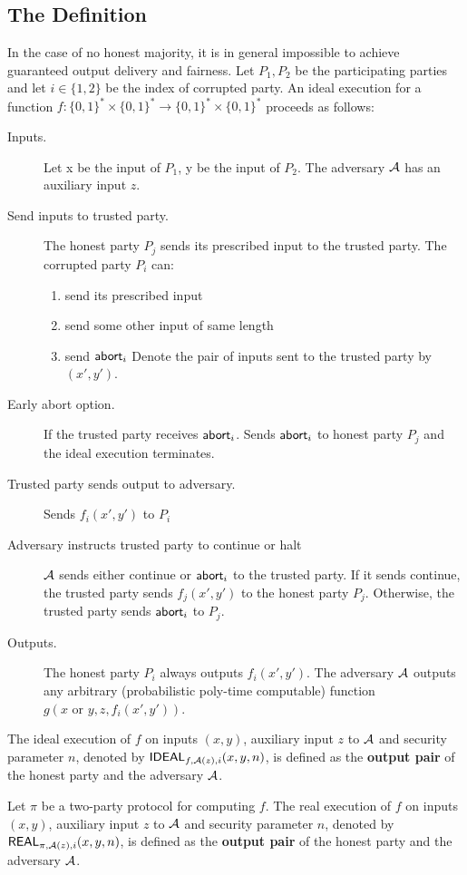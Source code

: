 \subsection{The Definition}

\begin{description}[leftmargin=0em]
\item[Execution in ideal mode.] In the case of no honest majority, it is in general impossible to achieve guaranteed output delivery and fairness. Let $P_1,P_2$ be the participating parties and let $i\in\{1,2\}$ be the index of corrupted party. An ideal execution for a function $f:\{0,1\}^*\times\{0,1\}^*\to\{0,1\}^*\times\{0,1\}^*$ proceeds as follows:
\begin{description}
\item[Inputs.] Let x be the input of $P_1$, y be the input of $P_2$. The adversary $\mathcal{A}$ has an auxiliary input $z$.
\item[Send inputs to trusted party.] The honest party $P_j$ sends its prescribed input to the trusted party. The corrupted party $P_i$ can:
\begin{enumerate}
\item send its prescribed input
\item send some other input of same length
\item send ${\sf abort}_i$
Denote the pair of inputs sent to the trusted party by $(x',y')$.
\end{enumerate}
\item[Early abort option.] If the trusted party receives ${\sf abort}_i$. Sends ${\sf abort}_i$ to honest party $P_j$ and the ideal execution terminates.
\item[Trusted party sends output to adversary.] Sends $f_i(x',y')$ to $P_i$
\item[Adversary instructs trusted party to continue or halt] $\mathcal{A}$ sends either {\sf continue} or ${\sf abort}_i$ to the trusted party. If it sends {\sf continue}, the trusted party sends $f_j(x',y')$ to the honest party $P_j$. Otherwise, the trusted party sends ${\sf abort}_i$ to $P_j$.
\item[Outputs.] The honest party $P_i$ always outputs $f_i(x',y')$. The adversary $\mathcal{A}$ outputs any arbitrary (probabilistic poly-time computable) function $g(x \text{ or } y,z,f_i(x',y'))$.
\end{description}
The {\sf ideal execution of }$f$ on inputs $(x,y)$, auxiliary input $z$ to $\mathcal{A}$ and security parameter $n$, denoted by ${\sf IDEAL}_{f,\mathcal{A}(z),i}(x,y,n)$, is defined as the {\bf output pair} of the honest party and the adversary $\mathcal{A}$.

\item[Execution in the real model.] Let $\pi$ be a two-party protocol for computing $f$.
The {\sf real execution of }$f$ on inputs $(x,y)$, auxiliary input $z$ to $\mathcal{A}$ and security parameter $n$, denoted by ${\sf REAL}_{\pi,\mathcal{A}(z),i}(x,y,n)$, is defined as the {\bf output pair} of the honest party and the adversary $\mathcal{A}$.
\end{description}

